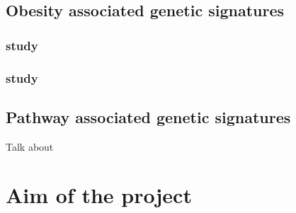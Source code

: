 
\subsection{Obesity associated genetic signatures}
\label{subsec:obesity_associated_genetic_signatures}

\subsubsection{\textbf{\citet{Creighton2012} study}}
\label{ssub:creighton_study}



\subsubsection{\textbf{\citet{Fuentes-Mattei2014} study}}
\label{ssub:fuentes_mattei_study}




\subsection{Pathway associated genetic signatures}
\label{sub:pathway_associated_genetic_signatures}

Talk about \citet{Gatza2010a}





\section{Aim of the project}
\label{sec:aim}




